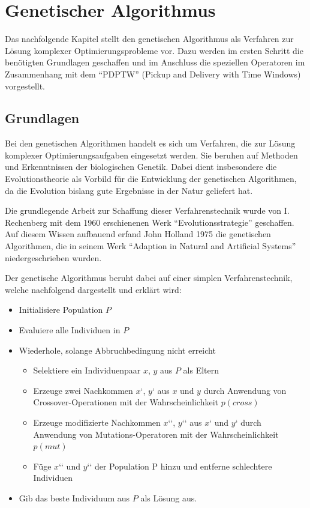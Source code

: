 \section{Genetischer Algorithmus}
\label{sec:GenetischerAlgorithmus}
Das nachfolgende Kapitel stellt den genetischen Algorithmus als Verfahren zur Lösung komplexer Optimierungsprobleme vor. Dazu werden im ersten Schritt die benötigten Grundlagen geschaffen und im Anschluss die speziellen Operatoren im Zusammenhang mit dem "`PDPTW"' (Pickup and Delivery with Time Windows) vorgestellt. 

\subsection{Grundlagen}
Bei den genetischen Algorithmen handelt es sich um Verfahren, die zur Lösung komplexer Optimierungsaufgaben eingesetzt werden. Sie beruhen auf Methoden und Erkenntnissen der biologischen Genetik. Dabei dient insbesondere die Evolutionstheorie als Vorbild für die Entwicklung der genetischen Algorithmen, da die Evolution bislang gute Ergebnisse in der Natur geliefert hat. \cite{jih2004family} \cite{bortfeldtplanen}

Die grundlegende Arbeit zur Schaffung dieser Verfahrenstechnik wurde von I. Rechenberg mit dem 1960 erschienenen Werk "`Evolutionsstrategie"' geschaffen. Auf diesem Wissen aufbauend erfand John Holland 1975 die genetischen Algorithmen, die in seinem Werk "`Adaption in Natural and Artificial Systems"' niedergeschrieben wurden.

Der genetische Algorithmus beruht dabei auf einer simplen Verfahrenstechnik, welche nachfolgend dargestellt und erklärt wird:
\begin{itemize}
 \item Initialisiere Population $P$
 \item Evaluiere alle Individuen in $P$
 \item Wiederhole, solange Abbruchbedingung nicht erreicht
 \begin{itemize}
  \item Selektiere ein Individuenpaar $x$, $y$ aus $P$ als Eltern
  \item Erzeuge zwei Nachkommen $x‘$, $y‘$ aus $x$ und $y$ durch Anwendung von Crossover-Operationen mit der Wahrscheinlichkeit $p(cross)$
  \item Erzeuge modifizierte Nachkommen $x‘‘$, $y‘‘$ aus $x‘$ und $y‘$ durch Anwendung von Mu\-ta\-tions-Operatoren mit der Wahrscheinlichkeit $p(mut)$
  \item Füge $x‘‘$ und $y‘‘$ der Population P hinzu und entferne schlechtere Individuen
 \end{itemize}
 \item Gib das beste Individuum aus $P$ als Lösung aus.
\end{itemize}

